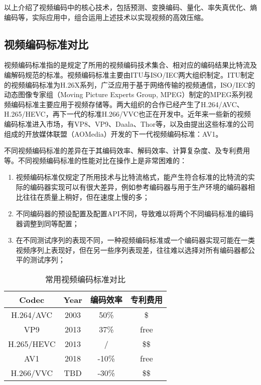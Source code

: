 以上介绍了视频编码中的核心技术，包括预测、变换编码、量化、率失真优化、熵编码等，实际应用中，组合运用上述技术以实现视频的高效压缩。
\subsection{视频编码标准对比}

视频编码标准指的是规定了所用的视频编码技术集合、相对应的编码结果比特流及编解码规范的标准。视频编码标准主要由ITU与ISO/IEC两大组织制定。ITU制定的视频编码标准为H.26X系列，广泛应用于基于网络传输的视频通信，ISO/IEC的动态图像专家组（Moving Picture Experts Group, MPEG）制定的MPEG系列视频编码标准主要应用于视频存储等。两大组织的合作已经产生了H.264/AVC、H.265/HEVC，再下一代的标准H.266/VVC也正在开发中。近年来一些新的视频编码标准进入市场，有VP8、VP9、Daala、Thor等，以及由提出这些标准的公司组成的开放媒体联盟（AOMedia）开发的下一代视频编码标准：AV1。

不同视频编码标准的差异在于其编码效率、解码效率、计算复杂度、及专利费用等。不同视频编码标准的性能对比在操作上是非常困难的\cite{laudeComprehensiveVideoCodec2019}：
\begin{enumerate} [label=\arabic*)]
  \item 视频编码标准仅规定了所用技术与比特流格式，能产生符合标准的比特流的实际的编码器实现可以有很大差异，例如参考编码器与用于生产环境的编码器相比往往在质量上稍好，但在速度上慢的多；
  \item 不同编码器的预设配置及配置API不同，导致难以将两个不同编码标准的编码器调整到同等配置；
  \item 在不同测试序列的表现不同，一种视频编码标准或一个编码器实现可能在一类视频序列上表现好，但在另一些序列表现差，往往难以选择对所有编码器都公平的测试序列；
\end{enumerate}

\begin{table}[!hpt]
  \renewcommand{\arraystretch}{0.9}
  \caption{常用视频编码标准对比}
  \label{tab:codec}
  \centering
  \begin{tabular}{cccc}
  	\toprule
  	  Codec    & Year & 编码效率  & 专利费用 \\ \midrule
  	H.264/AVC  & 2003 & 50\%  &  \$  \\ %
  	   VP9     & 2013 & 37\%  & free \\
  	H.265/HEVC & 2013 &   /   & \$\$ \\
  	   AV1     & 2018 & -10\% & free \\
  	H.266/VVC  & TBD  & -30\% & \$\$ \\ \bottomrule
  \end{tabular}
\end{table}

